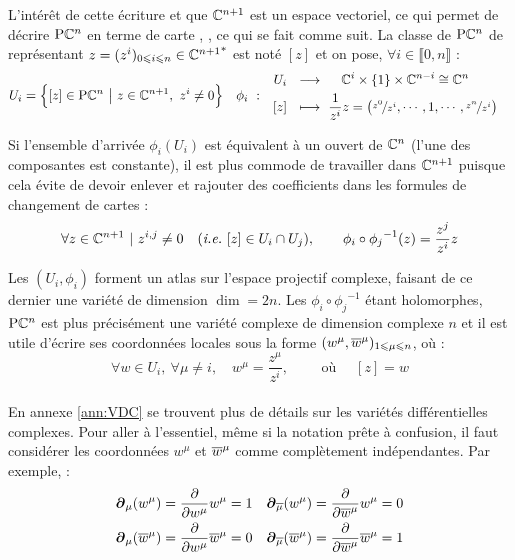 L'intérêt de cette écriture et que $\mathbb{C}^{n+1}$ est un espace vectoriel, ce qui permet de décrire $\text{\normalfont P}\mathbb{C}^{n}$ en terme de carte \cite[lemme 2.17, p. 64]{lafontaine_introduction_2015}, \cite[chap. 2]{ballmann_lectures_2006}, ce qui se fait comme suit.
La classe de $\text{\normalfont P}\mathbb{C}^{n}$ de représentant $z = (z^i)_{0\leqslant i\leqslant n}\in{\mathbb{C}^{n+1}}^*$ est noté $[z]$ et on pose, $\forall i\in\llbracket0,n\rrbracket$ :
\begin{align}
	U_i &= \Big\{[z]\in\text{\normalfont P}\mathbb{C}^{n}\ \big|\ z\in \mathbb{C}^{n+1},\ z^i\neq 0\Big\}  &  \phi_i\  :\quad &\begin{aligned}
		U_i\ \ &\longrightarrow\quad\ \mathbb{C}^{i}\times \{1\} \times\mathbb{C}^{n-i}\cong \mathbb{C}^{n} \\ [z]\ \ &\longmapsto\ \frac{1}{z^i}z = \big(\nicefrac{z^0}{z^i},\cdots, 1, \cdots, \nicefrac{z^n}{z^i}\big)
	\end{aligned}
\end{align}
\begin{remarque}
	Si l'ensemble d'arrivée $\phi_i(U_i)$ est équivalent à un ouvert de $\mathbb{C}^{n}$ (l'une des composantes est constante), il est plus commode de travailler dans $\mathbb{C}^{n+1}$ puisque cela évite de devoir enlever et rajouter des coefficients dans les formules de changement de cartes :
	\[ \forall z\in\mathbb{C}^{n+1}\ |\ z^{i,j}\neq 0\quad (\textit{i.e.}~[z]\in U_i\cap U_j) ,\qquad \phi_i \circ {\phi_j}^{-1}(z) = \frac{z^j}{z^i}z\]
\end{remarque}
\skipl
Les $(U_i,\phi_i)$ forment un atlas sur l'espace projectif complexe, faisant de ce dernier une variété de dimension $\dim = 2n$. Les $\phi_i \circ {\phi_j}^{-1}$ étant holomorphes, $\text{\normalfont P}\mathbb{C}^{n}$ est plus précisément une variété complexe de dimension complexe $n$ et il est utile d'écrire ses coordonnées locales sous la forme $(w^\mu, \overline{w}^\mu)_{1\leqslant \mu \leqslant n}$, où :
\[\forall w\in U_i,\ \forall \mu\neq i,\quad w^\mu = \frac{z^\mu}{z^i},\qquad  \text{ où }\quad [z] = w\]
\\
En annexe \ref{ann:VDC} se trouvent plus de détails sur les variétés différentielles complexes. Pour aller à l'essentiel, même si la notation prête à confusion, il faut considérer les coordonnées $w^\mu$ et $\overline{w}^\mu$ comme complètement indépendantes.
Par exemple, :
\begin{align*}
	\boldsymbol{\partial}_\mu(w^\mu) &= \frac{\partial}{\partial w^\mu} w^\mu = 1  &  
	\boldsymbol{\partial}_{\overline{\mu}}(w^\mu) = \frac{\partial}{\partial \overline{w}^\mu} w^\mu &= 0 
		\\
	\boldsymbol{\partial}_\mu(\overline{w}^\mu) &= \frac{\partial}{\partial w^\mu} \overline{w}^\mu = 0  &  
	\boldsymbol{\partial}_{\overline{\mu}}(\overline{w}^\mu) = \frac{\partial}{\partial \overline{w}^\mu} \overline{w}^\mu &= 1
\end{align*}
